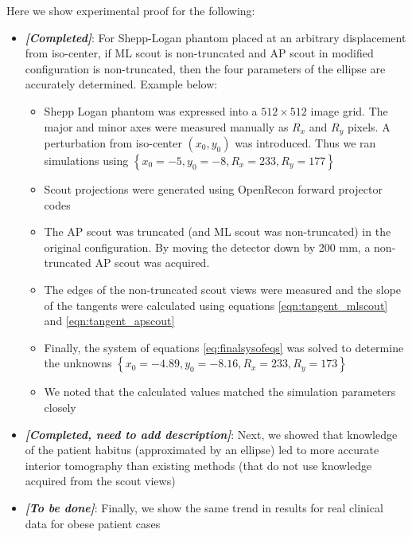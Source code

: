 \documentclass[]{spie}
\begin{document}
Here we show experimental proof for the following:
\begin{itemize}
	\item \textbf{\textit{[Completed]}}: For Shepp-Logan phantom placed at an arbitrary displacement from iso-center, if ML scout is non-truncated and AP scout in modified configuration is non-truncated, then the four parameters of the ellipse are accurately determined. Example below:
		\begin{itemize}
			\item Shepp Logan phantom was expressed into a $512 \times 512$ image grid. The major and minor axes were measured manually as $R_x $ and $R_y $ pixels. A perturbation from iso-center $(x_0, y_0)$ was introduced. Thus we ran simulations using $\left\lbrace x_0 = -5, y_0 = -8, R_x = 233 , R_y = 177 \right\rbrace$
			\item Scout projections were generated using OpenRecon forward projector codes
			\item The AP scout was truncated (and ML scout was non-truncated) in the original configuration. By moving the detector down by 200 mm, a non-truncated AP scout was acquired. 
			\item The edges of the non-truncated scout views were measured and the slope of the tangents were calculated using equations \ref{eqn:tangent_mlscout} and \ref{eqn:tangent_apscout}
			\item Finally, the system of equations \ref{eq:finalsysofeqs} was solved to determine the unknowns $\left\lbrace x_0 = -4.89, y_0 = -8.16, R_x = 233 , R_y = 173 \right\rbrace$
			\item We noted that the calculated values matched the simulation parameters closely
		\end{itemize}
	\item \textbf{\textit{[Completed, need to add description]}}: Next, we showed that knowledge of the patient habitus (approximated by an ellipse) led to more accurate interior tomography than existing methods (that do not use knowledge acquired from the scout views)
	\item \textbf{\textit{[To be done]}}: Finally, we show the same trend in results for real clinical data for obese patient cases
\end{itemize}




\end{document}
